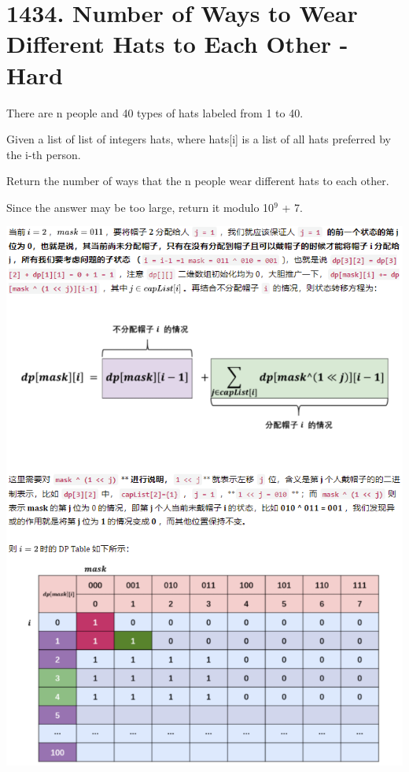 \documentclass[9pt, b5paaper]{book}
\begin{document}
\section{1434. Number of Ways to Wear Different Hats to Each Other - Hard}
\label{sec-11-13}
There are n people and 40 types of hats labeled from 1 to 40.

Given a list of list of integers hats, where hats[i] is a list of all hats preferred by the i-th person.

Return the number of ways that the n people wear different hats to each other.

Since the answer may be too large, return it modulo 10$^{\text{9}}$ + 7.

\includegraphics[width=.9\linewidth]{./pic/hats.png}
\end{document}
